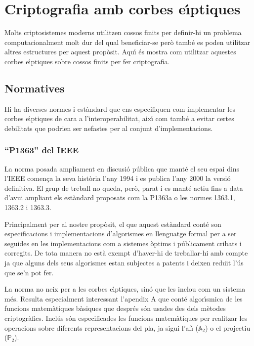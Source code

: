 \documentclass[12pt,twoside,catalan,a4paper]{book}%
\numberwithin{figure}{section}		%
\theoremstyle{definition}   			%
\def\ces{corbes e\lgem{}\'{\i}ptiques}%
\def\cfs{cossos finits}%
\newcommand{\A}{\ensuremath{\mathbb{A}_{2}}}%
\newcommand{\Proy}{\ensuremath{\mathbb{P}_{2}}}%
\theoremstyle{saltolinea}   			%
\begin{document}
\section{Criptografia amb \ces}\label{sec:criptografiaEC}

Molts criptosistemes moderns utilitzen \cfs{} per definir-hi un problema computacionalment molt dur del qual beneficiar-se per\`o tamb\'e es poden utilitzar altres estructures per aquest prop\`osit. Aqu\'{\i} \'es mostra com utilitzar aquestes \ces{} sobre \cfs{} per fer criptografia.

\subsection{Normatives}\label{subsec:normes}

Hi ha diverses normes i est\`andard que ens especifiquen com implementar les \ces{} de cara a l'interoperabilitat, aix\'{\i} com tamb\'e a evitar certes debilitats que podrien ser nefastes per al conjunt d'implementacions.

\subsubsection{``P1363'' del IEEE}

La norma \cite{P1363} posada ampliament en discusi\'o p\'ublica que mant\'e el seu espai dins l'IEEE comen\c{c}a la seva hist\`oria l'any 1994 i es publica l'any 2000 la versi\'o definitiva. El grup de treball no queda, per\`o, parat i es mant\'e actiu fins a data d'avui ampliant els est\`andard proposats com la P1363a o les normes 1363.1, 1363.2 i 1363.3.

Principalment per al nostre prop\`osit, el que aquest est\`andard cont\'e son especificacions i implementacions d'algorismes en llenguatge formal per a ser seguides en les implementacions com a sistemes \`optims i p\'ublicament cribats i corregits. De tota manera no est\`a exempt d'haver-hi de treballar-hi amb compte ja que alguns dels seus algorismes estan subjectes a patents i deixen redu\"{\i}t l'\'us que se'n pot fer.

La norma no neix per a les \ces{}, sin\'o que les inclou com un sistema m\'es. Resulta especialment interessant l'apendix A que cont\'e algor\'{\i}smica de les funcions matem\`atiques b\`asiques que despr\'es s\'on usades des dels m\`etodes criptogr\`afics. Incl\'us s\'on especificades les funcions matem\`atiques per realitzar les operacions sobre diferents representacions del pla, ja sigui l'af\'{\i} (\A) o el projectiu (\Proy).
\end{document}
